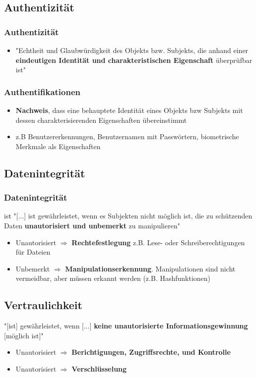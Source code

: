 \documentclass{article}
\begin{document}
\subsection{Authentizität}
\subsubsection{Authentizität}
\begin{itemize}
    \item "Echtheit und Glaubwürdigkeit des Objekts bzw. Subjekts, die anhand einer \textbf{eindeutigen Identität und charakteristischen Eigenschaft} überprüfbar ist"
\end{itemize}
\subsubsection{Authentifikationen}
\begin{itemize}
    \item \textbf{Nachweis}, dass eine behauptete Identität eines Objekts bzw Subjekts mit dessen charakterisierenden Eigenschaften übereinstimmt
    \item z.B Benutzererkennungen, Benutzernamen mit Passwörtern, biometrische Merkmale als Eigenschaften
\end{itemize}
\subsection{Datenintegrität}
\subsubsection{Datenintegrität}
ist "[...] ist gewährleistet, wenn es Subjekten nicht möglich ist, die zu schützenden Daten \textbf{unautorisiert und unbemerkt} zu manipulieren"
\begin{itemize}
    \item Unautorisiert $\Rightarrow$ \textbf{Rechtefestlegung} z.B. Lese- oder Schreiberechtigungen für Dateien
    \item Unbemerkt $\Rightarrow$ \textbf{Manipulationserkennung}. Manipulationen sind nicht vermeidbar, aber müssen erkannt werden (z.B. Hashfunktionen)
\end{itemize}
\subsection{Vertraulichkeit}
"[ist] gewährleistet, wenn [...] \textbf{keine unautorisierte Informationsgewinnung} [möglich ist]"
\begin{itemize}
    \item Unautorisiert $\Rightarrow$ \textbf{Berichtigungen, Zugriffsrechte, und Kontrolle}
    \item Unautorisiert $\Rightarrow$ \textbf{Verschlüsselung}
\end{itemize}
\end{document}
